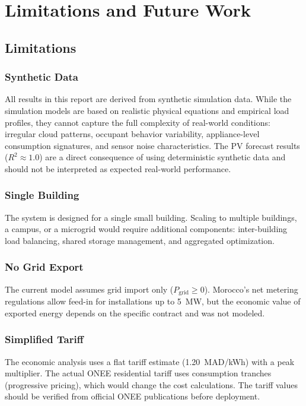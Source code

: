 \chapter{Limitations and Future Work}
\label{ch:limitations}

\section{Limitations}

\subsection{Synthetic Data}

All results in this report are derived from synthetic simulation data. While the simulation models are based on realistic physical equations and empirical load profiles, they cannot capture the full complexity of real-world conditions: irregular cloud patterns, occupant behavior variability, appliance-level consumption signatures, and sensor noise characteristics. The PV forecast results ($R^2 \approx 1.0$) are a direct consequence of using deterministic synthetic data and should not be interpreted as expected real-world performance.

\subsection{Single Building}

The system is designed for a single small building. Scaling to multiple buildings, a campus, or a microgrid would require additional components: inter-building load balancing, shared storage management, and aggregated optimization.

\subsection{No Grid Export}

The current model assumes grid import only ($P_{\text{grid}} \geq 0$). Morocco's net metering regulations allow feed-in for installations up to 5~MW, but the economic value of exported energy depends on the specific contract and was not modeled.

\subsection{Simplified Tariff}

The economic analysis uses a flat tariff estimate (1.20~MAD/kWh) with a peak multiplier. The actual ONEE residential tariff uses consumption tranches (progressive pricing), which would change the cost calculations. The tariff values should be verified from official ONEE publications before deployment.

